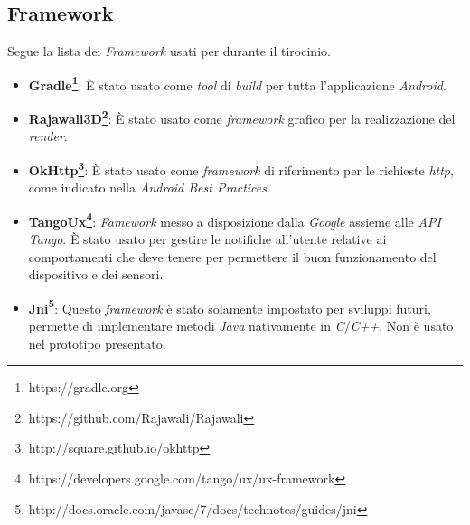 \subsection{Framework}
Segue la lista dei \emph{Framework} usati per durante il tirocinio.
\begin{itemize}
	\item \textbf{Gradle\footnote{https://gradle.org}}: È stato usato come \emph{tool} di \emph{build} per tutta l'applicazione \emph{Android}.
	\item \textbf{Rajawali3D\footnote{https://github.com/Rajawali/Rajawali}}: È stato usato come \emph{framework} grafico per la realizzazione del \emph{render}.
	\item \textbf{OkHttp\footnote{http://square.github.io/okhttp}}: È stato usato come \emph{framework} di riferimento per le richieste \emph{http}, come indicato nella \emph{Android Best Practices}.
	\item \textbf{TangoUx\footnote{https://developers.google.com/tango/ux/ux-framework}}: \emph{Famework} messo a disposizione dalla \emph{Google} assieme alle \emph{API Tango}. È stato usato per gestire le notifiche all'utente relative ai comportamenti che deve tenere per permettere il buon funzionamento del dispositivo e dei sensori.
	\item \textbf{Jni\footnote{http://docs.oracle.com/javase/7/docs/technotes/guides/jni}}: Questo \emph{framework} è stato solamente impostato per sviluppi futuri, permette di implementare metodi \emph{Java} nativamente in \emph{C}/\emph{C++}. Non è usato nel prototipo presentato.
\end{itemize}













